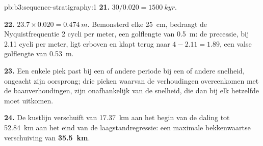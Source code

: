 \begin{solution}{pb:b3:sequence-stratigraphy:1}
\textbf{21.} $30/0.020 = \qty{1500}{kyr}$.

\textbf{22.} $23.7\times0.020 = \qty{0.474}{m}$. Bemonsterd elke
\qty{25}{cm}, bedraagt de Nyquistfrequentie 2 cycli per meter, een golflengte van
\qty{0.5}{m}: de precessie, bij 2.11 cycli per meter, ligt erboven en klapt terug
naar $4 - 2.11 = 1.89$, een valse golflengte van \qty{0.53}{m}.

\textbf{23.} Een enkele piek past bij een of andere periode bij een of andere snelheid, ongeacht
zijn oorsprong; drie pieken waarvan de verhoudingen overeenkomen met de baanverhoudingen, zijn onafhankelijk van
de snelheid, die dan bij elk hetzelfde moet uitkomen.

\textbf{24.} De kustlijn verschuift van \qty{17.37}{km} aan het begin van de
daling tot \qty{52.84}{km} aan het eind van de laagstandregressie: een maximale
bekkenwaartse verschuiving van \textbf{\qty[text-series-to-math=true]{35.5}{km}}.
\end{solution}
